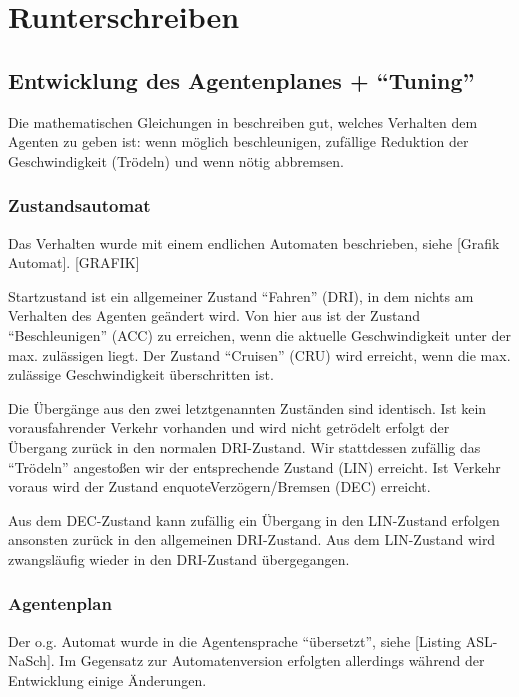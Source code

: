\section{Runterschreiben}
\label{sec:rusch}



\subsection{Entwicklung des Agentenplanes + \enquote{Tuning}}

Die mathematischen Gleichungen in \cite{na-sch} beschreiben gut, welches Verhalten dem Agenten zu geben ist: wenn möglich beschleunigen, zufällige Reduktion der Geschwindigkeit (Trödeln) und wenn nötig abbremsen.

\subsubsection{Zustandsautomat}

Das Verhalten wurde mit einem endlichen Automaten beschrieben, siehe [Grafik Automat].
[GRAFIK]

Startzustand ist ein allgemeiner Zustand \enquote{Fahren} (DRI), in dem nichts am Verhalten des Agenten geändert wird.
Von hier aus ist der Zustand \enquote{Beschleunigen} (ACC) zu erreichen, wenn die aktuelle Geschwindigkeit unter der max. zulässigen liegt. 
Der Zustand \enquote{Cruisen} (CRU) wird erreicht, wenn die max. zulässige Geschwindigkeit überschritten ist.

Die Übergänge aus den zwei letztgenannten Zuständen sind identisch. 
Ist kein vorausfahrender Verkehr vorhanden und wird nicht getrödelt erfolgt der Übergang zurück in den normalen DRI-Zustand.
Wir stattdessen zufällig das \enquote{Trödeln} angestoßen wir der entsprechende Zustand (LIN) erreicht.
Ist Verkehr voraus wird der Zustand enquote{Verzögern/Bremsen} (DEC) erreicht.

Aus dem DEC-Zustand kann zufällig ein Übergang in den LIN-Zustand erfolgen ansonsten zurück in den allgemeinen DRI-Zustand.
Aus dem LIN-Zustand wird zwangsläufig wieder in den DRI-Zustand übergegangen.

\subsubsection{Agentenplan}

Der o.g. Automat wurde in die Agentensprache \enquote{übersetzt}, siehe [Listing ASL-NaSch]. 
Im Gegensatz zur Automatenversion erfolgten allerdings während der Entwicklung einige Änderungen. 

